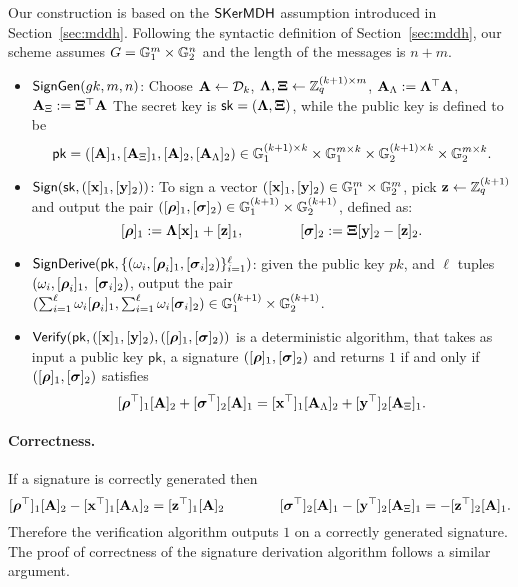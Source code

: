 Our construction is based on the $\mathsf{SKerMDH}$ assumption introduced in Section~\ref{sec:mddh}. Following the syntactic definition of Section~\ref{sec:mddh},
our scheme assumes $G = \mathbb{G}_1^m\times\mathbb{G}_2^n$ and the length of the messages is $n+m$.
 
\begin{itemize}
\item $\mathsf{SignGen}(gk,m,n)$:
Choose $\mathbf{{A}} \leftarrow \mathcal{D}_{k}$,
$\mathbf{{\Lambda}},\mathbf{{\Xi}} \leftarrow \mathbb{Z}_q^{(k+1) \times m}$, $\mathbf{A}_{\Lambda}:=\mathbf{{\Lambda}}^\top \mathbf{{A}}$, 
$\mathbf{A}_{\Xi}:=\mathbf{{\Xi}}^\top \mathbf{{A}}$
The secret key is $\mathsf{sk}=(\mathbf{{\Lambda}},\mathbf{{\Xi}})$, while the public key is defined to be
$$\mathsf{pk}=([\mathbf{A}]_1, [\mathbf{A}_{\Xi}]_1,[\mathbf{A}]_2, [\mathbf{A}_{\Lambda}]_2) \in  \mathbb{G}_1^{(k+1) \times k} \times \mathbb{G}_1^{m \times k} \times \mathbb{G}_2^{(k+1) \times k} \times \mathbb{G}_2^{m \times k}.$$
\item $\mathsf{Sign}(\mathsf{sk},([\mathbf{x}]_1,[\mathbf{y}]_2))$: To sign a vector $([\mathbf{x}]_1,[\mathbf{y}]_2) \in \mathbb{G}_1^{m} \times \mathbb{G}_2^{m}$, pick 
$\mathbf{z} \leftarrow \mathbb{Z}_q^{(k+1)}$ and output the pair 
$([{\boldsymbol \rho}]_1, [{\boldsymbol \sigma}]_2) \in \mathbb{G}_1^{(k+1)} \times \mathbb{G}_2^{(k+1)}$, defined as:
$$[{\boldsymbol \rho}]_1:=   \mathbf{{\Lambda}}[\mathbf{x}]_1 + [\mathbf{z}]_1,
                            \qquad \qquad 
[{\boldsymbol \sigma}]_2 := \mathbf{{\Xi}}[\mathbf{y}]_2 - [\mathbf{z}]_2.$$   
 \item  $\mathsf{SignDerive}(\mathsf{pk},\{(\omega_i,[{\boldsymbol \rho}_i]_1, [{\boldsymbol \sigma}_i]_2)\}_{i=1}^{\ell})$: given the public key $pk$, and $\ell$ tuples 
 $(\omega_i,[{\boldsymbol \rho}_i]_1,$ $[{\boldsymbol \sigma}_i]_2)$, output the pair 
 $(\sum_{i=1}^{\ell} \omega_i [{\boldsymbol \rho}_i]_1, \sum_{i=1}^{\ell} \omega_i  [{\boldsymbol \sigma}_i]_2) \in \mathbb{G}_1^{(k+1)} \times \mathbb{G}_2^{(k+1)}$. 
 \item $\mathsf{Verify}(\mathsf{pk},([\mathbf{x}]_1,[\mathbf{y}]_2), ([{\boldsymbol \rho}]_1, [{\boldsymbol \sigma}]_2))$  is a deterministic algorithm, that takes as input a public key $\mathsf{pk}$,  a signature $([{\boldsymbol \rho}]_1, [{\boldsymbol \sigma}]_2)$ and returns $1$ if and only if 
$([{\boldsymbol \rho}]_1, [{\boldsymbol \sigma}]_2)$ satisfies
$$ [{\boldsymbol \rho}^{\top}]_1 [\mathbf{A}]_2+ [{\boldsymbol \sigma}^{\top}]_2 [\mathbf{A}]_1= [\mathbf{x}^{\top}]_1 [\mathbf{A}_{\Lambda}]_2+[\mathbf{y}^{\top}]_2[\mathbf{A}_{\Xi}]_1. $$
\end{itemize}

\paragraph{Correctness.} If a signature is correctly generated then 
$$[{\boldsymbol \rho}^{\top}]_1 [\mathbf{{A}}]_2-[\mathbf{x}^{\top}]_1 [\mathbf{{A}}_{\Lambda}]_2= [\mathbf{z}^{\top}]_1 [\mathbf{{A}}]_2 \qquad \qquad  [{\boldsymbol \sigma}^{\top}]_2[\mathbf{{A}}]_1 -[\mathbf{y}^{\top}]_2  [\mathbf{{A}}_{\Xi}]_1= -[\mathbf{z}^{\top}]_2 [\mathbf{{A}}]_1.$$
Therefore the verification algorithm outputs $1$ on a correctly generated signature. The proof of correctness  of the signature derivation algorithm follows a similar argument.  

